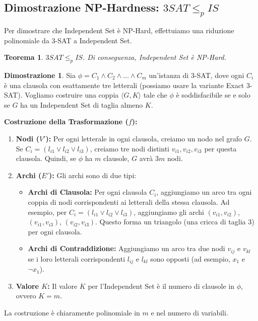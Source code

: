\documentclass[a4paper]{article}
\newtheorem{theorem}{Teorema}[section]
\theoremstyle{definition} %
\newtheorem*{proof*}{Dimostrazione}
\begin{document}
\subsection{Dimostrazione NP-Hardness: $3SAT \le_p IS$}

Per dimostrare che Independent Set è NP-Hard, effettuiamo una riduzione polinomiale da 3-SAT a Independent Set.

\begin{theorem}
$3SAT \le_p IS$. Di conseguenza, \emph{Independent Set} è NP-Hard.
\end{theorem}

\begin{proof*}
Sia $\phi = C_1 \land C_2 \land \dots \land C_m$ un'istanza di 3-SAT, dove ogni $C_i$ è una clausola con esattamente tre letterali (possiamo usare la variante Exact 3-SAT). Vogliamo costruire una coppia $\langle G, K \rangle$ tale che $\phi$ è soddisfacibile se e solo se $G$ ha un Independent Set di taglia almeno $K$.

\textbf{Costruzione della Trasformazione ($f$):}
\begin{enumerate}
    \item \textbf{Nodi ($V'$):} Per ogni letterale in ogni clausola, creiamo un nodo nel grafo $G$. Se $C_i = (l_{i1} \lor l_{i2} \lor l_{i3})$, creiamo tre nodi distinti $v_{i1}, v_{i2}, v_{i3}$ per questa clausola.
    Quindi, se $\phi$ ha $m$ clausole, $G$ avrà $3m$ nodi.
    \item \textbf{Archi ($E'$):} Gli archi sono di due tipi:
    \begin{itemize}
        \item \textbf{Archi di Clausola:} Per ogni clausola $C_i$, aggiungiamo un arco tra ogni coppia di nodi corrispondenti ai letterali della stessa clausola. Ad esempio, per $C_i = (l_{i1} \lor l_{i2} \lor l_{i3})$, aggiungiamo gli archi $(v_{i1}, v_{i2})$, $(v_{i1}, v_{i3})$, $(v_{i2}, v_{i3})$. Questo forma un triangolo (una cricca di taglia 3) per ogni clausola.
        \item \textbf{Archi di Contraddizione:} Aggiungiamo un arco tra due nodi $v_{ij}$ e $v_{kl}$ se i loro letterali corrispondenti $l_{ij}$ e $l_{kl}$ sono opposti (ad esempio, $x_1$ e $\neg x_1$).
    \end{itemize}
    \item \textbf{Valore $K$:} Il valore $K$ per l'Independent Set è il numero di clausole in $\phi$, ovvero $K=m$.
\end{enumerate}
La costruzione è chiaramente polinomiale in $m$ e nel numero di variabili.


\end{proof*}
\end{document}

